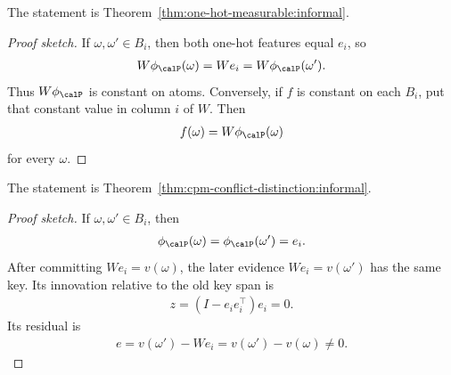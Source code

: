 \begin{theorem}
\label{thm:one-hot-measurable:sketch}
The statement is Theorem~\ref{thm:one-hot-measurable:informal}.
\end{theorem}
\begin{proof}[Proof sketch]
If $\omega,\omega'\in B_i$, then both one-hot features equal $e_i$, so
\begin{align*}
W\phi_\calP(\omega)=We_i=W\phi_\calP(\omega').
\end{align*}
Thus $W\phi_\calP$ is constant on atoms. Conversely, if $f$ is constant on each $B_i$, put that constant value in column $i$ of $W$. Then
\begin{align*}
f(\omega)=W\phi_\calP(\omega)
\end{align*}
for every $\omega$.
\end{proof}

\begin{theorem}
\label{thm:cpm-conflict-distinction:sketch}
The statement is Theorem~\ref{thm:cpm-conflict-distinction:informal}.
\end{theorem}
\begin{proof}[Proof sketch]
If $\omega,\omega'\in B_i$, then
\begin{align*}
\phi_\calP(\omega)=\phi_\calP(\omega')=e_i.
\end{align*}
After committing $We_i=v(\omega)$, the later evidence $We_i=v(\omega')$ has the same key. Its innovation relative to the old key span is
\begin{align*}
z=(I-e_ie_i^\top)e_i=0.
\end{align*}
Its residual is
\begin{align*}
e=v(\omega')-We_i=v(\omega')-v(\omega)\ne0.
\end{align*}
\end{proof}
